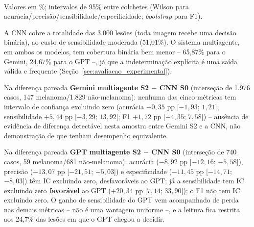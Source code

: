 \begin{table}[H]
	\centering
	\caption{Análise 1 -- CNN (S0) e sistema multiagente (S2), 3.000 lesões.}
	\label{tab:analise1}
	\\ \footnotesize Valores em \%; intervalos de 95\% entre colchetes (Wilson para acurácia/precisão/sensibilidade/especificidade; \textit{bootstrap} para F1).
\end{table}

A CNN cobre a totalidade das 3.000 lesões (toda imagem recebe uma decisão binária), ao custo de sensibilidade moderada (51,01\%). O sistema multiagente, em ambos os modelos, tem cobertura binária bem menor -- 65,87\% para o Gemini, 24,67\% para o GPT --, já que a indeterminação explícita é uma saída válida e frequente (Seção~\ref{sec:avaliacao_experimental}).

Na diferença pareada \textbf{Gemini multiagente S2 $-$ CNN S0} (interseção de 1.976 casos, 147 melanoma/1.829 não-melanoma): nenhuma das cinco métricas tem intervalo de confiança excluindo zero (acurácia $-0,35$ pp [$-1,93$; $1,21$]; sensibilidade $+5,44$ pp [$-3,29$; $13,92$]; F1 $+1,72$ pp [$-4,35$; $7,58$]) -- ausência de evidência de diferença detectável nesta amostra entre Gemini S2 e a CNN, não demonstração de que tenham desempenho equivalente.

Na diferença pareada \textbf{GPT multiagente S2 $-$ CNN S0} (interseção de 740 casos, 59 melanoma/681 não-melanoma): acurácia ($-8,92$ pp [$-12,16$; $-5,58$]), precisão ($-13,07$ pp [$-21,51$; $-5,03$]) e especificidade ($-11,45$ pp [$-14,71$; $-8,03$]) têm IC excluindo zero, desfavoráveis ao GPT; já a sensibilidade tem IC excluindo zero \textbf{favorável} ao GPT ($+20,34$ pp [$7,14$; $33,90$]); o F1 não tem IC excluindo zero. O ganho de sensibilidade do GPT vem acompanhado de perda nas demais métricas -- não é uma vantagem uniforme --, e a leitura fica restrita aos 24,7\% das lesões em que o GPT chegou a decidir.

